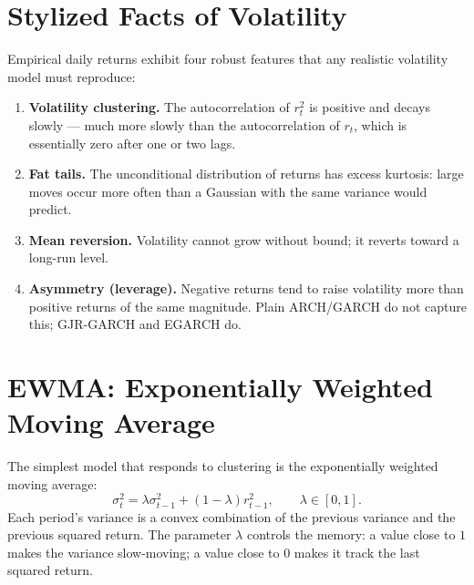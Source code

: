 \section{Stylized Facts of Volatility}


Empirical daily returns exhibit four robust features that any realistic
volatility model must reproduce:

\begin{enumerate}
    \item \textbf{Volatility clustering.} The autocorrelation of $r_t^2$ is
      positive and decays slowly --- much more slowly than the autocorrelation
      of $r_t$, which is essentially zero after one or two lags.
    \item \textbf{Fat tails.} The unconditional distribution of returns has
      excess kurtosis: large moves occur more often than a Gaussian with the
      same variance would predict.
    \item \textbf{Mean reversion.} Volatility cannot grow without bound; it
      reverts toward a long-run level.
    \item \textbf{Asymmetry (leverage).} Negative returns tend to raise
      volatility more than positive returns of the same magnitude. Plain
      ARCH/GARCH do not capture this; GJR-GARCH and EGARCH do.
\end{enumerate}

\section{EWMA: Exponentially Weighted Moving Average}


The simplest model that responds to clustering is the exponentially weighted
moving average:
\[
\sigma_t^2 = \lambda \sigma_{t-1}^2 + (1 - \lambda) r_{t-1}^2,
\qquad \lambda \in [0, 1].
\]
Each period's variance is a convex combination of the previous variance and
the previous squared return. The parameter $\lambda$ controls the memory: a
value close to $1$ makes the variance slow-moving; a value close to $0$
makes it track the last squared return.

